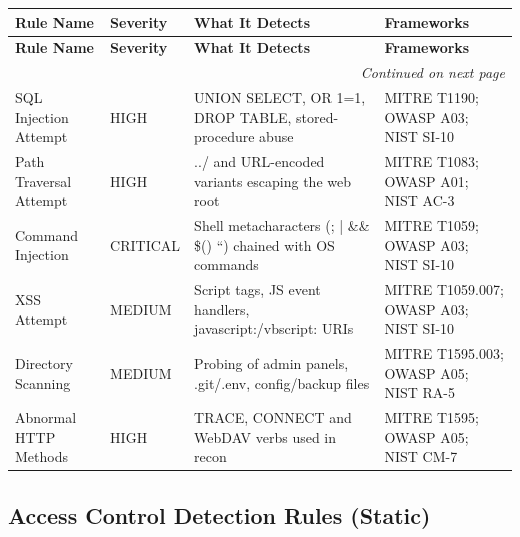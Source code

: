 \documentclass[12pt,a4paper]{article}
\begin{document}
\begin{longtable}{|p{4.2cm}|p{1.7cm}|p{4.6cm}|p{4.2cm}|}
\hline
\textbf{Rule Name} & \textbf{Severity} & \textbf{What It Detects} & \textbf{Frameworks} \\
\hline
\endfirsthead
\hline
\textbf{Rule Name} & \textbf{Severity} & \textbf{What It Detects} & \textbf{Frameworks} \\
\hline
\endhead
\hline
\multicolumn{4}{|r|}{\textit{Continued on next page}} \\
\hline
\endfoot
\hline
\endlastfoot
SQL Injection Attempt & HIGH & UNION SELECT, OR 1=1, DROP TABLE, stored-procedure abuse & MITRE T1190; OWASP A03; NIST SI-10 \\
\hline
Path Traversal Attempt & HIGH & ../ and URL-encoded variants escaping the web root & MITRE T1083; OWASP A01; NIST AC-3 \\
\hline
Command Injection & CRITICAL & Shell metacharacters (; | \&\& \$() ``) chained with OS commands & MITRE T1059; OWASP A03; NIST SI-10 \\
\hline
XSS Attempt & MEDIUM & Script tags, JS event handlers, javascript:/vbscript: URIs & MITRE T1059.007; OWASP A03; NIST SI-10 \\
\hline
Directory Scanning & MEDIUM & Probing of admin panels, .git/.env, config/backup files & MITRE T1595.003; OWASP A05; NIST RA-5 \\
\hline
Abnormal HTTP Methods & HIGH & TRACE, CONNECT and WebDAV verbs used in recon & MITRE T1595; OWASP A05; NIST CM-7 \\
\hline
\end{longtable}



\subsection{Access Control Detection Rules (Static)}
\end{document}
